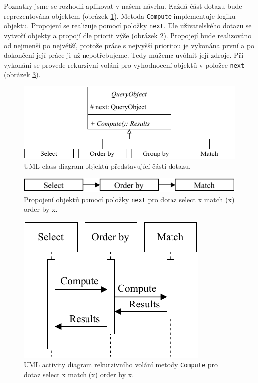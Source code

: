 Poznatky jsme se rozhodli aplikovat v našem návrhu.
Každá část dotazu bude reprezentována objektem (obrázek \ref{figure.diaQueryObjects}).
Metoda \verb+Compute+ implementuje logiku objektu.
Propojení se realizuje pomocí položky \verb+next+.
Dle uživatelského dotazu se vytvoří objekty a propojí dle priorit výše (obrázek \ref{figure.diaQueryObjectsCon}).
Propojejí bude realizováno od nejmenší po největší, protože práce s nejvyšší prioritou je vykonána první a po dokončení její práce ji už nepotřebujeme.
Tedy můžeme uvólnit její zdroje.
Při vykonání se provede rekurzivní voláni pro vyhodnocení objektů v položce \verb+next+ (obrázek \ref{figure.diaQueryObjectsCall}). 

\begin{figure}[!htp]
\includegraphics{../img/diaQueryObjects.pdf}\centering
\caption{UML class diagram objektů představující části dotazu.}
\label{figure.diaQueryObjects}
\end{figure}

\clearpage

\begin{figure}[!htp]
\includegraphics{../img/diaQueryObjectsCon.pdf}\centering
\caption{Propojení objektů pomocí položky \texttt{next} pro dotaz select x match (x) order by x.}
\label{figure.diaQueryObjectsCon}
\end{figure}

\begin{figure}[!htp]
\includegraphics{../img/diaQueryObjectsCall.pdf}\centering
\caption{UML activity diagram rekurzivního volání metody \texttt{Compute} pro dotaz select x match (x) order by x.}
\label{figure.diaQueryObjectsCall}
\end{figure}

